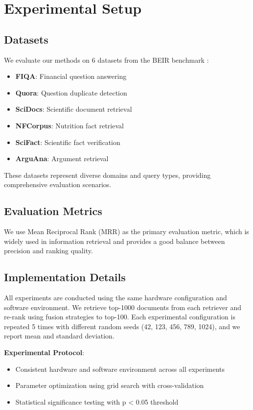 \documentclass[letterpaper]{article} %
\begin{document}
\section{Experimental Setup}

\subsection{Datasets}

We evaluate our methods on 6 datasets from the BEIR benchmark \cite{thakur2021beir}:

\begin{itemize}
\item \textbf{FIQA}: Financial question answering
\item \textbf{Quora}: Question duplicate detection
\item \textbf{SciDocs}: Scientific document retrieval
\item \textbf{NFCorpus}: Nutrition fact retrieval
\item \textbf{SciFact}: Scientific fact verification
\item \textbf{ArguAna}: Argument retrieval
\end{itemize}

These datasets represent diverse domains and query types, providing comprehensive evaluation scenarios.

\subsection{Evaluation Metrics}

We use Mean Reciprocal Rank (MRR) as the primary evaluation metric, which is widely used in information retrieval and provides a good balance between precision and ranking quality.

\subsection{Implementation Details}

All experiments are conducted using the same hardware configuration and software environment. We retrieve top-1000 documents from each retriever and re-rank using fusion strategies to top-100. Each experimental configuration is repeated 5 times with different random seeds (42, 123, 456, 789, 1024), and we report mean and standard deviation.

\textbf{Experimental Protocol}:
\begin{itemize}
\item Consistent hardware and software environment across all experiments
\item Parameter optimization using grid search with cross-validation
\item Statistical significance testing with p < 0.05 threshold
\end{itemize}
\end{document}
